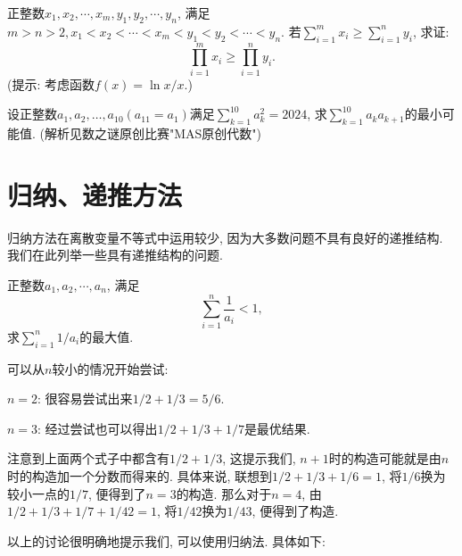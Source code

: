 \documentclass[lang=cn,12pt,thmcnt=section]{elegantbook}
\begin{document}
\begin{exercise}
正整数$x_1,x_2,\cdots,x_m,y_1,y_2,\cdots,y_n$, 满足$m>n>2, x_1<x_2<\cdots<x_m<y_1<y_2<\cdots<y_n$. 若$\sum_{i=1}^mx_i\geq\sum_{i=1}^ny_i$, 求证:
\[\prod_{i=1}^m x_i\ge\prod_{i=1}^n y_i.\]
({\kaishu 提示: 考虑函数$f(x)=\ln{x}/x$.})
\end{exercise}

\begin{exercise}
设正整数$a_1,a_2,\dots{},a_{10}(a_{11}=a_1)$满足$\sum\limits_{k=1}^{10}a_k^2=2024$, 求$\sum\limits_{k=1}^{10}a_ka_{k+1}$的最小可能值.
({\kaishu 解析见数之谜原创比赛"MAS原创代数"})
\end{exercise}


\section{归纳、递推方法}
归纳方法在离散变量不等式中运用较少, 因为大多数问题不具有良好的递推结构. 我们在此列举一些具有递推结构的问题.

\begin{example}
正整数$a_{1},a_{2},\cdots,a_{n}$, 满足
\[ \sum_{i=1}^{n}\frac{1}{a_{i}}<1, \]
求$\sum_{i=1}^{n}1/a_{i}$的最大值.
\end{example}

\begin{analysis}
可以从$n$较小的情况开始尝试:\par
$n=2$: 很容易尝试出来$1/2+1/3=5/6$.\par
$n=3$: 经过尝试也可以得出$1/2+1/3+1/7$是最优结果.\par
注意到上面两个式子中都含有$1/2+1/3$, 这提示我们, $n+1$时的构造可能就是由$n$时的构造加一个分数而得来的. 具体来说, 联想到$1/2+1/3+1/6=1$, 将$1/6$换为较小一点的$1/7$, 便得到了$n=3$的构造. 那么对于$n=4$, 由$1/2+1/3+1/7+1/42=1$, 将$1/42$换为$1/43$, 便得到了构造.\par
以上的讨论很明确地提示我们, 可以使用归纳法. 具体如下:
\end{analysis}
\end{document}
